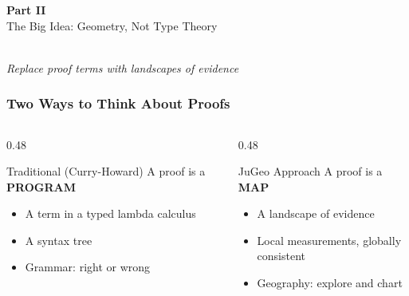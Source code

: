 \providecommand{\jugmark}[1]{\textbf{\color{jugeoBlue}#1}}

\begin{frame}
\frametitle{}
\vfill
\begin{center}
  {\Huge\color{jugeoBlue}\textbf{Part II}}\\[12pt]
  {\LARGE\color{jugeoDark}The Big Idea: Geometry, Not Type Theory}\\[20pt]
  \\[12pt]
  {\large\color{gray}\itshape Replace proof terms with landscapes of evidence}
\end{center}
\vfill
\end{frame}

\begin{frame}
\frametitle{Two Ways to Think About Proofs}
\begin{columns}[T]
\begin{column}{0.48\textwidth}
\begin{alertblock}{Traditional (Curry-Howard)}
  A proof is a \jugmark{PROGRAM}
  \begin{itemize}
    \item A term in a typed lambda calculus
    \item A syntax tree
    \item Grammar: right or wrong
  \end{itemize}
\end{alertblock}
\end{column}
\begin{column}{0.48\textwidth}
\begin{exampleblock}{JuGeo Approach}
  A proof is a \jugmark{MAP}
  \begin{itemize}
    \item A landscape of evidence
    \item Local measurements, globally consistent
    \item Geography: explore and chart
  \end{itemize}
\end{exampleblock}
\end{column}
\end{columns}
\vspace{10pt}
\begin{center}
\end{center}
\end{frame}

